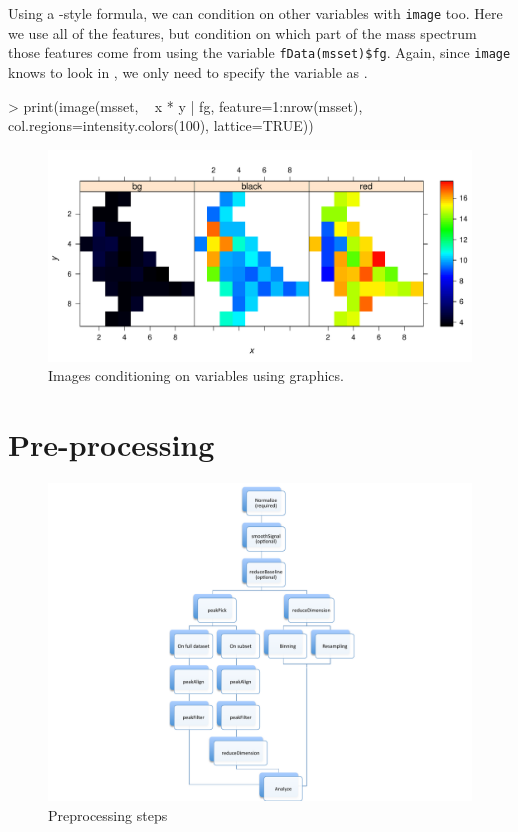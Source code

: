 \documentclass[a4paper]{article}
\begin{document}
Using a -style formula, we can condition on other variables with \verb|image| too. Here we use all of the features, but condition on which part of the mass spectrum those features come from using the variable \verb|fData(msset)$fg|. Again, since \verb|image| knows to look in , we only need to specify the variable as .
\begin{Schunk}
\begin{Sinput}
> print(image(msset, ~ x * y | fg, feature=1:nrow(msset), col.regions=intensity.colors(100), lattice=TRUE))
\end{Sinput}
\end{Schunk}
\begin{figure}
\begin{center}
\includegraphics{Cardinal-demo-036}
\caption{\small Images conditioning on variables using  graphics.}
\end{center}
\end{figure}





\section{Pre-processing}

\begin{figure}
\begin{center}
\includegraphics{preprocessingRoughDraft.pdf}
\caption{\small Preprocessing steps}
\end{center}
\end{figure}
\end{document}
